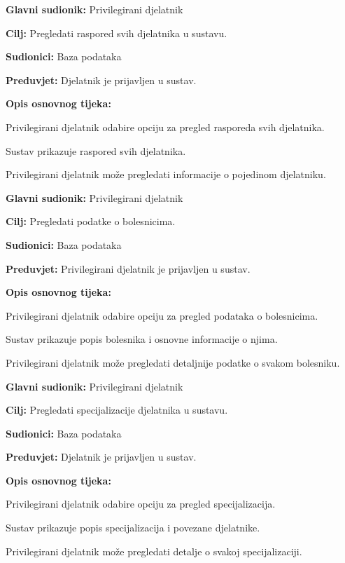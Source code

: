 	\item \textbf{Glavni sudionik:} Privilegirani djelatnik
	\item \textbf{Cilj:} Pregledati raspored svih djelatnika u sustavu.
	\item \textbf{Sudionici:} Baza podataka
	\item \textbf{Preduvjet:} Djelatnik je prijavljen u sustav.
	\item \textbf{Opis osnovnog tijeka:}
	\begin{packed_enum}
		\item Privilegirani djelatnik odabire opciju za pregled rasporeda svih djelatnika.
		\item Sustav prikazuje raspored svih djelatnika.
		\item Privilegirani djelatnik može pregledati informacije o pojedinom djelatniku.
	\end{packed_enum}
\closeusecase

	\item \textbf{Glavni sudionik:} Privilegirani djelatnik
	\item \textbf{Cilj:} Pregledati podatke o bolesnicima.
	\item \textbf{Sudionici:} Baza podataka
	\item \textbf{Preduvjet:} Privilegirani djelatnik je prijavljen u sustav.
	\item \textbf{Opis osnovnog tijeka:}
	\begin{packed_enum}
		\item Privilegirani djelatnik odabire opciju za pregled podataka o bolesnicima.
		\item Sustav prikazuje popis bolesnika i osnovne informacije o njima.
		\item Privilegirani djelatnik može pregledati detaljnije podatke o svakom bolesniku.
	\end{packed_enum}
\closeusecase

	\item \textbf{Glavni sudionik:} Privilegirani djelatnik
	\item \textbf{Cilj:} Pregledati specijalizacije djelatnika u sustavu.
	\item \textbf{Sudionici:} Baza podataka
	\item \textbf{Preduvjet:} Djelatnik je prijavljen u sustav.
	\item \textbf{Opis osnovnog tijeka:}
	\begin{packed_enum}
		\item Privilegirani djelatnik odabire opciju za pregled specijalizacija.
		\item Sustav prikazuje popis specijalizacija i povezane djelatnike.
		\item Privilegirani djelatnik može pregledati detalje o svakoj specijalizaciji.
	\end{packed_enum}
\closeusecase

